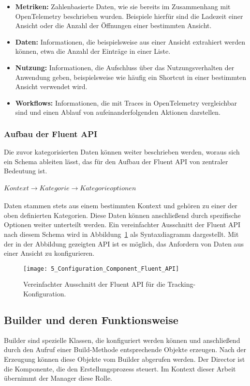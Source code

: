 \begin{itemize}
    \item \textbf{Metriken:} Zahlenbasierte Daten, wie sie bereits im Zusammenhang mit OpenTelemetry beschrieben wurden. Beispiele hierfür sind die Ladezeit einer Ansicht oder die Anzahl der Öffnungen einer bestimmten Ansicht.
    \item \textbf{Daten:} Informationen, die beispielsweise aus einer Ansicht extrahiert werden können, etwa die Anzahl der Einträge in einer Liste.
    \item \textbf{Nutzung:} Informationen, die Aufschluss über das Nutzungsverhalten der Anwendung geben, beispielsweise wie häufig ein Shortcut in einer bestimmten Ansicht verwendet wird.
    \item \textbf{Workflows:} Informationen, die mit Traces in OpenTelemetry vergleichbar sind und einen Ablauf von aufeinanderfolgenden Aktionen darstellen.
\end{itemize}

\subsubsection{Aufbau der Fluent API}
Die zuvor kategorisierten Daten können weiter beschrieben werden, woraus sich ein Schema ableiten lässt, das für den Aufbau der Fluent API von zentraler Bedeutung ist.\\
\\
$Kontext \rightarrow Kategorie \rightarrow Kategorieoptionen$\\
\\
Daten stammen stets aus einem bestimmten Kontext und gehören zu einer der oben definierten Kategorien. Diese Daten können anschließend durch spezifische Optionen weiter unterteilt werden. Ein vereinfachter Ausschnitt der Fluent API nach diesem Schema wird in Abbildung~\ref{fig:configuration_component_fluent_api} als Syntaxdiagramm dargestellt. Mit der in der Abbildung gezeigten API ist es möglich, das Anfordern von Daten aus einer Ansicht zu konfigurieren.

\begin{figure}[H]
    \centering
    \texttt{[image: 5\_Configuration\_Component\_Fluent\_API]}
    \caption{Vereinfachter Ausschnitt der Fluent API für die Tracking-Konfiguration.}
    \label{fig:configuration_component_fluent_api}
\end{figure}

\subsection{Builder und deren Funktionsweise}
Builder \cite{sarcar2004design} sind spezielle Klassen, die konfiguriert werden können und anschließend durch den Aufruf einer Build-Methode entsprechende Objekte erzeugen. Nach der Erzeugung können diese Objekte vom Builder abgerufen werden. Der Director ist die Komponente, die den Erstellungsprozess steuert. Im Kontext dieser Arbeit übernimmt der Manager diese Rolle.

